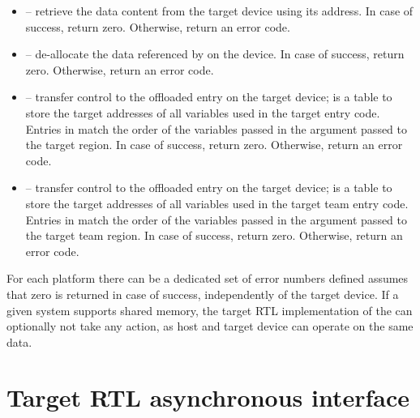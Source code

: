 \begin{itemize}
  \item {} – retrieve the data content from the target device using its address. In case of success, return zero. Otherwise, return an error code.

  \item {} – de-allocate the data referenced by  on the device. In case of success, return zero. Otherwise, return an error code.

  \item {} – transfer control to the offloaded entry on the target device;  is a table to store the target addresses of all variables used in the target entry code. Entries in  match the order of the variables passed in the  argument passed to the target region. In case of success, return zero. Otherwise, return an error code.

  \item {} – transfer control to the offloaded entry on the target device;  is a table to store the target addresses of all variables used in the target team entry code. Entries in  match the order of the variables passed in the  argument passed to the target team region. In case of success, return zero. Otherwise, return an error code.

\end{itemize}

For each platform there can be a dedicated set of error numbers defined \libomptarget{} assumes that zero is returned in case of success, independently of the target device. If a given system supports shared memory, the target RTL implementation of the  can optionally not take any action, as host and target device can operate on the same data.



\section{Target RTL asynchronous interface} \label{sc:TargetRTLInterfaceAsync}

